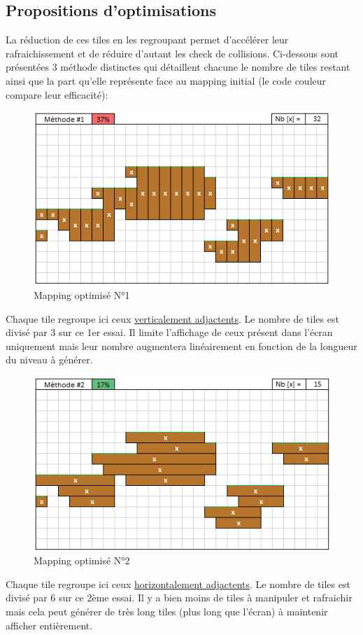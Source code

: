 \documentclass{report}
\begin{document}
				\newpage
				\subsection{Propositions d'optimisations}

La r\'{e}duction de ces tiles en les regroupant permet d'acc\'{e}l\'{e}rer leur rafraichissement et de r\'{e}duire d'autant les check de collisions.
Ci-dessous sont pr\'{e}sent\'{e}es 3 m\'{e}thode distinctes qui d\'{e}taillent chacune le nombre de tiles restant ainsi que la part qu'elle repr\'{e}sente face au
mapping initial (le code couleur compare leur efficacit\'{e}):

\begin{figure}[h!]
	\caption{\label{Mapping opti 1} Mapping optimis\'{e} N°1}
	\includegraphics[scale=1]{Opti_tiles_002.png}
	\centering
\end{figure}
Chaque tile regroupe ici ceux \underline{verticalement adjactents}. Le nombre de tiles est divis\'{e} par 3 sur ce 1er essai. Il limite l'affichage de ceux
pr\'{e}sent dans l'\'{e}cran uniquement mais leur nombre augmentera lin\'{e}airement en fonction de la longueur du niveau à g\'{e}n\'{e}rer.

\begin{figure}[h!]
	\caption{\label{Mapping opti 2} Mapping optimis\'{e} N°2}
	\includegraphics[scale=1]{Opti_tiles_003.png}
	\centering
\end{figure}
Chaque tile regroupe ici ceux \underline{horizontalement adjactents}. Le nombre de tiles est divis\'{e} par 6 sur ce 2\`{e}me essai. Il y a bien moins de tiles à
manipuler et rafraichir mais cela peut g\'{e}n\'{e}rer de tr\`{e}s long tiles (plus long que l'\'{e}cran) à maintenir afficher enti\`{e}rement.
\end{document}

